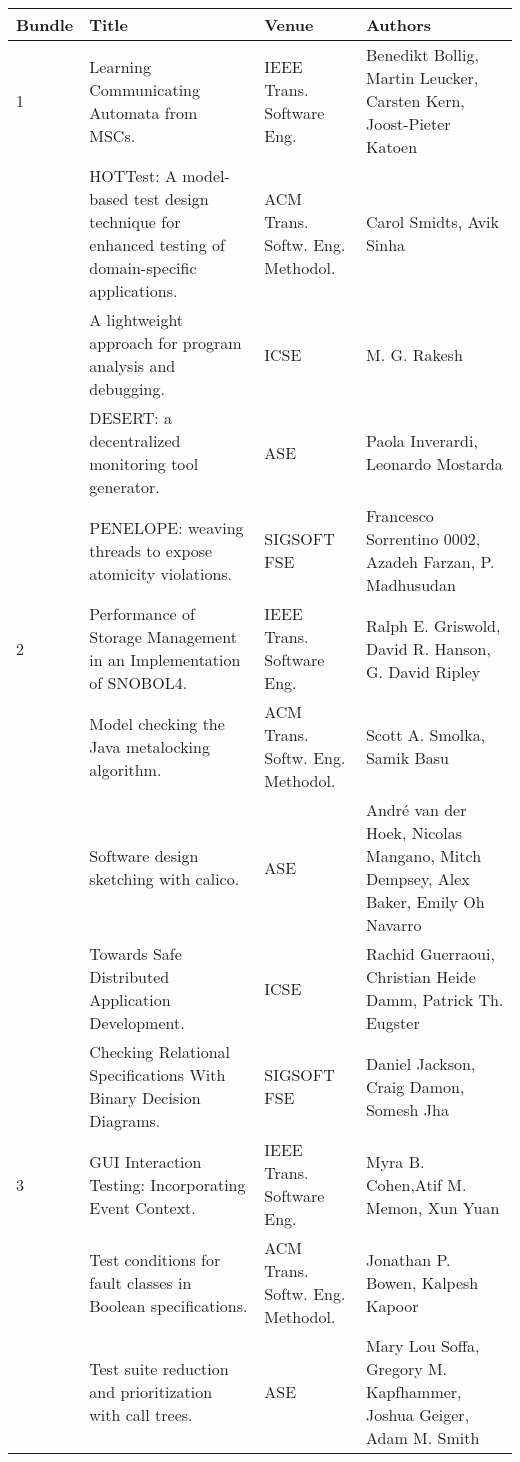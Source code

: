 \begin{table}[ht]
  \centering
  \resizebox{\textwidth}{!} {
    \begin{tabular}{|llll|}
    \hline
    Bundle & Title & Venue & Authors \\
    \hline
\rowcolor{black!20} 1 & Learning Communicating Automata from MSCs.& IEEE Trans. Software Eng.& 
Benedikt Bollig, Martin Leucker, Carsten Kern, Joost-Pieter Katoen \\
 & HOTTest: A model-based test design technique for enhanced testing of domain-specific 
applications.& ACM Trans. Softw. Eng. Methodol.& Carol Smidts, Avik Sinha \\
\rowcolor{black!20} & A lightweight approach for program analysis and debugging.& ICSE& M. G. Rakesh 
\\
 & DESERT: a decentralized monitoring tool generator.& ASE& Paola Inverardi, Leonardo Mostarda \\
\rowcolor{black!20} & PENELOPE: weaving threads to expose atomicity violations.& SIGSOFT FSE& 
Francesco Sorrentino 0002, Azadeh Farzan, P. Madhusudan \\
2 & Performance of Storage Management in an Implementation of SNOBOL4.& IEEE Trans. Software Eng.& 
Ralph E. Griswold, David R. Hanson, G. David Ripley \\
\rowcolor{black!20} & Model checking the Java metalocking algorithm.& ACM Trans. Softw. Eng. 
Methodol.& Scott A. Smolka, Samik Basu \\
 & Software design sketching with calico.& ASE& André van der Hoek, Nicolas Mangano, Mitch Dempsey, 
Alex Baker, Emily Oh Navarro \\
\rowcolor{black!20} & Towards Safe Distributed Application Development.& ICSE& Rachid Guerraoui, 
Christian Heide Damm, Patrick Th. Eugster \\
 & Checking Relational Specifications With Binary Decision Diagrams.& SIGSOFT FSE& Daniel Jackson, 
Craig Damon, Somesh Jha \\
\rowcolor{black!20} 3 & GUI Interaction Testing: Incorporating Event Context.& IEEE Trans. Software 
Eng.& Myra B. Cohen,Atif M. Memon, Xun Yuan \\
 & Test conditions for fault classes in Boolean specifications.& ACM Trans. Softw. Eng. Methodol.& 
Jonathan P. Bowen, Kalpesh Kapoor \\
\rowcolor{black!20} & Test suite reduction and prioritization with call trees.& ASE& Mary Lou Soffa, 
Gregory M. Kapfhammer, Joshua Geiger, Adam M. Smith \\

\end{tabular}}
\end{table}

